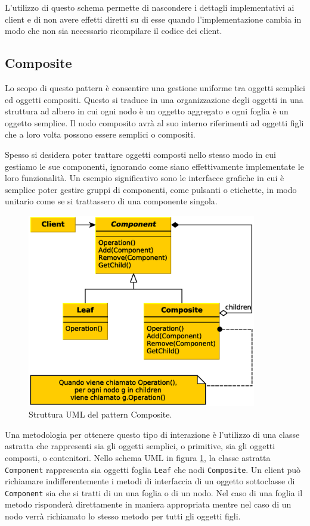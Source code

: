 L'utilizzo di questo schema permette di nascondere i dettagli implementativi ai client e di non avere effetti diretti su di esse quando l'implementazione cambia in modo che non sia necessario ricompilare il codice dei client. 

\subsection{Composite}
\label{sub:composite}
Lo scopo di questo pattern \`e consentire una gestione uniforme tra oggetti semplici ed oggetti compositi. Questo si traduce in una organizzazione degli oggetti in una struttura ad albero in cui ogni nodo \`e un oggetto aggregato e ogni foglia \`e un oggetto semplice.
Il nodo composito avr\`a al suo interno riferimenti ad oggetti figli che a loro volta possono essere semplici o compositi.

Spesso si desidera poter trattare oggetti composti nello stesso modo in cui gestiamo le sue componenti, ignorando come siano effettivamente implementate le loro funzionalit\`a. Un esempio significativo sono le interfacce grafiche in cui \`e semplice poter gestire gruppi di componenti, come pulsanti o etichette, in modo unitario come se si trattassero di una componente singola.

\begin{figure}
\begin{center}
\includegraphics[width=10cm]{Immagini/CompositePattern}
\caption{Struttura UML del pattern Composite.\label{f:compositepattern}} 
\end{center} 
\end{figure}

Una metodologia per ottenere questo tipo di interazione \`e l'utilizzo di una classe astratta che rappresenti sia gli oggetti semplici, o primitive, sia gli oggetti composti, o contenitori. Nello schema \ac{UML} in figura \ref{f:compositepattern}, la classe astratta \texttt{Component} rappresenta sia oggetti foglia \texttt{Leaf} che nodi \texttt{Composite}. Un client pu\`o richiamare indifferentemente i metodi di interfaccia di un oggetto sottoclasse di \texttt{Component} sia che si tratti di un una foglia o di un nodo. Nel caso di una foglia il metodo risponder\`a direttamente in maniera appropriata mentre nel caso di un nodo verr\`a richiamato lo stesso metodo per tutti gli oggetti figli.

